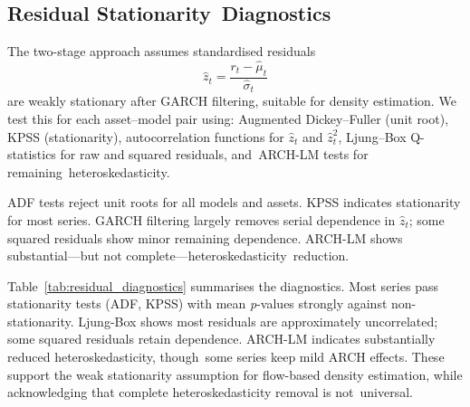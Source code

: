 \documentclass[risks,article,accept,pdftex,moreauthors]{Definitions/mdpi}
\begin{document}
\subsection{Residual Stationarity~Diagnostics}
\label{subsec:resid_stationarity}
The two-stage approach assumes standardised residuals
\[
\hat{z}_t = \frac{r_t - \hat{\mu}_t}{\hat{\sigma}_t}
\]
are weakly stationary after GARCH filtering, suitable for density estimation. We test this for each asset--model pair using: Augmented Dickey--Fuller (unit root), KPSS (stationarity), autocorrelation functions for $\hat{z}_t$ and $\hat{z}_t^2$, Ljung--Box Q-statistics for raw and squared residuals, and~ARCH-LM tests for remaining~heteroskedasticity.

ADF tests reject unit roots for all models and assets. KPSS indicates stationarity for most series. GARCH filtering largely removes serial dependence in $\hat{z}_t$; some squared residuals show minor remaining dependence. ARCH-LM shows substantial—but not complete—heteroskedasticity~reduction.

Table~\ref{tab:residual_diagnostics} summarises the diagnostics. Most series pass stationarity tests (ADF, KPSS) with mean \emph{p}-values strongly against non-stationarity. Ljung-Box shows most residuals are approximately uncorrelated; some squared residuals retain dependence. ARCH-LM indicates substantially reduced heteroskedasticity, though~some series keep mild ARCH effects. These support the weak stationarity assumption for flow-based density estimation, while acknowledging that complete heteroskedasticity removal is not~universal.
\end{document}

